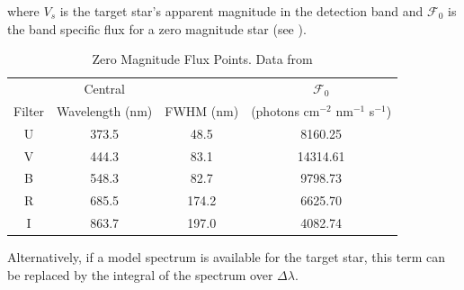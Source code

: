 where $V_s$ is the target star's apparent magnitude in the detection band and $\mathcal{F}_0$ is the band specific flux for a zero magnitude star (see ). 
\begin{table}[ht]
\caption[Zero Magnitude Flux Points]{Zero Magnitude Flux Points. Data from  \citet{colina1996}\label{table:zeroMagFluxes}}
\begin{center}
\begin{tabular}{ c c c c }
\hline\hline
&  Central & & $\mathcal{F}_0$ \\
Filter & Wavelength (nm) & FWHM (nm) & (photons cm$^{-2}$ nm$^{-1}$ s$^{-1}$)\\
\hline
U & 373.5 & 48.5 & 8160.25\\
V & 444.3 & 83.1 & 14314.61\\
B & 548.3 & 82.7 & 9798.73\\
R & 685.5 & 174.2 & 6625.70\\
I & 863.7 & 197.0 & 4082.74\\    
\hline
\end{tabular}
\end{center}
\end{table}
Alternatively, if a model spectrum is available for the target star, this term can be replaced by the integral of the spectrum over $\Delta \lambda$.

